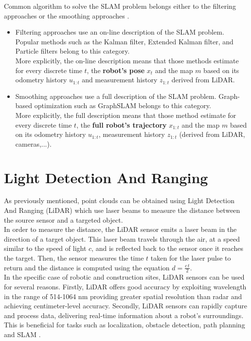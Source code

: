 Common algorithm to solve the SLAM problem belongs either to the filtering approaches or the smoothing approaches \cite{AchilleThesis}.  
\begin{itemize}
    \item Filtering approaches use an on-line description of the SLAM problem. Popular methods such as the Kalman filter, Extended Kalman filter, and Particle filters belong to this category.\\
    More explicitly, the on-line description means that those methods estimate for every discrete time $t$, the \textbf{robot’s pose} $x_t$ and the map $m$ based on its odometry history $u_{1:t}$ and measurement history $z_{1:t}$ derived from LiDAR.

    \item Smoothing approaches use a full description of the SLAM problem. Graph-based optimization such as GraphSLAM belongs to this category.\\
    More explicitly, the full description means that those method estimate for every discrete time $t$, the \textbf{full robot’s trajectory} $x_{1:t}$ and the map $m$ based on its odometry history $u_{1:t}$, measurement history $z_{1:t}$ (derived from LiDAR, cameras,...).\\
\end{itemize}

\section{Light Detection And Ranging}
As previously mentioned, point clouds can be obtained using Light Detection And Ranging (LiDAR) which use laser beams to measure the distance between the source sensor and a targeted object.\\

In order to measure the distance, the LiDAR sensor emits a laser beam in the direction of a target object. This laser beam travels through the air, at a speed similar to the speed of light $c$, and is reflected back to the sensor once it reaches the target. Then, the sensor measures the time $t$ taken for the laser pulse to return and the distance is computed using the equation $d = \frac{c \, t }{2}$.\\

In the specific case of robotic and construction sites, LiDAR sensors can be used for several reasons. Firstly, LiDAR offers good accuracy by exploiting wavelength in the range of 514-1064 nm providing greater spatial resolution than radar and achieving centimeter-level accuracy. Secondly, LiDAR sensors can rapidly capture and process data, delivering real-time information about a robot's surroundings. This is beneficial for tasks such as localization, obstacle detection, path planning and SLAM \cite{AchilleThesis}\cite{LiDAR_review}. \\

